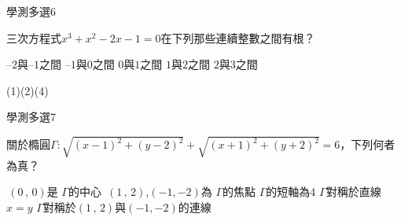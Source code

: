 \begin{QUESTIONS}
\begin{QUESTION}
        \begin{QEMPTYSPACE}
        \end{QEMPTYSPACE}
    \end{QUESTION}
    \begin{QUESTION}
        \begin{ExamInfo}{88}{學測}{多選}{6}
        \end{ExamInfo}
        \begin{ExamAnsRateInfo}{}{}{}{}
        \end{ExamAnsRateInfo}
        \begin{QBODY}
            三次方程式${{x}^{3}}+{{x}^{2}}-2x-1=0$在下列那些連續整數之間有根？
            \begin{QOPS}
                \QOP $–2$與$–1$之間
                \QOP $–1$與$0$之間
                \QOP $0$與$1$之間
                \QOP $1$與$2$之間
                \QOP $2$與$3$之間
            \end{QOPS}
        \end{QBODY}
        \begin{QFROMS}
        \end{QFROMS}
        \begin{QTAGS}\end{QTAGS}
        \begin{QANS}
            (1)(2)(4)
        \end{QANS}
        \begin{QSOLLIST}
        \end{QSOLLIST}
        \begin{QEMPTYSPACE}
        \end{QEMPTYSPACE}
    \end{QUESTION}
    \begin{QUESTION}
        \begin{ExamInfo}{88}{學測}{多選}{7}
        \end{ExamInfo}
        \begin{ExamAnsRateInfo}{}{}{}{}
        \end{ExamAnsRateInfo}
        \begin{QBODY}
            關於橢圓$\Gamma: \sqrt{{{(x-1)}^{2}}+{{(y-2)}^{2}}}+\sqrt{{{(x+1)}^{2}}+{{(y+2)}^{2}}}=6$，下列何者為真？
            \begin{QOPS}
                \QOP $\,(0\,,\,0)$是 $\Gamma$的中心
                \QOP $\,(1\,,\,2)$,$(-1,-2)$為 $\Gamma$的焦點
                \QOP $\Gamma$的短軸為4
                \QOP $\Gamma$對稱於直線$x=y$
                \QOP $\Gamma$對稱於$(1\,,\,2)$與$(-1,-2)$的連線

\end{QOPS}
\end{QBODY}
\end{QUESTION}
\end{QUESTIONS}
